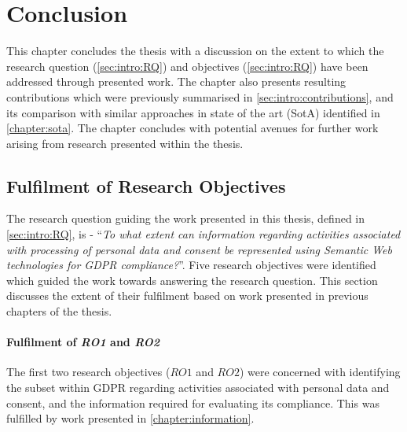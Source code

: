 \chapter{Conclusion}\label{chapter:conclusion}
This chapter concludes the thesis with a discussion on the extent to which the research question (\autoref{sec:intro:RQ}) and objectives (\autoref{sec:intro:RQ}) have been addressed through presented work. The chapter also presents resulting contributions which were previously summarised in \autoref{sec:intro:contributions}, and its comparison with similar approaches in state of the art (SotA) identified in \autoref{chapter:sota}. The chapter concludes with potential avenues for further work arising from research presented within the thesis.

\section{Fulfilment of Research Objectives}\label{sec:conclusion-RO}
The research question guiding the work presented in this thesis, defined in \autoref{sec:intro:RQ}, is - ``\textit{To what extent can information regarding activities associated with processing of personal data and consent be represented using Semantic Web technologies for GDPR compliance?}''.
Five research objectives were identified which guided the work towards answering the research question.
This section discusses the extent of their fulfilment based on work presented in previous chapters of the thesis.

\subsubsection*{Fulfilment of \textit{RO1} and \textit{RO2}}
The first two research objectives ($RO1$ and $RO2$) were concerned with identifying the subset within GDPR regarding activities associated with personal data and consent, and the information required for evaluating its compliance. This was fulfilled by work presented in \autoref{chapter:information}.

